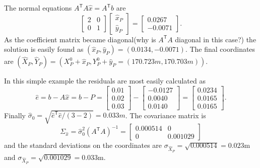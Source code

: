 The normal equations $A^\mathsf{T}A\hat{x} = A^\mathsf{T}b$ are
\begin{equation*}
	\begin{bmatrix}
		2  & 0 \\
		0 & 1
	\end{bmatrix}
	\begin{bmatrix}
		\hat{x}_P \\ \hat{y}_P
	\end{bmatrix}
	=
	\begin{bmatrix}
		0.0267\\
		-0.0071
	\end{bmatrix}.
\end{equation*}
As the coefficient matrix became diagonal(why is $A^\mathsf{T}A$ diagonal in this case?) the solution is easily found as $(\hat{x}_P,\hat{y}_P) = (0.013 4,-0.007 1)$. The final coordinates are $(\hat{X}_P,\hat{Y}_P) = (X_{P}^{0} + \hat{x}_P,Y_{P}^{0} + \hat{y}_P =  (170.723 m, 170.703 m))$.
\par
In this simple example the residuals are most easily calculated as
\begin{equation*}
	\hat{e} = b - A\hat{x}
	= b - P
	=
	\begin{bmatrix}
		0.01 \\ 0.02 \\ 0.03
	\end{bmatrix}
	-
	\begin{bmatrix}
		-0.0127 \\ 0.0040 \\ 0.0140
	\end{bmatrix}
	=
	\begin{bmatrix}
		0.0234 \\ 0.0165 \\ 0.0165
	\end{bmatrix}.
\end{equation*}
Finally ${\hat{\sigma}}_0 = \sqrt{\hat{e}^\mathsf{T}\hat{e}/(3 - 2)} = 0.033m$. The covariance matrix is
\begin{equation*}
	\Sigma_{\hat{x}}
	= {\hat{\sigma}}_{0}^{2}(A^\mathsf{T}A)^{-1}
	=
	\begin{bmatrix}
		0.000514 & 0\\
		0 & 0.001029
	\end{bmatrix}
\end{equation*}
and the standard deviations on the coordinates are $\sigma_{\hat{X}_P} = \sqrt{0.000514} = 0.023$m and $\sigma_{\hat{X}_P} = \sqrt{0.001 029} = 0.033$m.
\par\noindent
